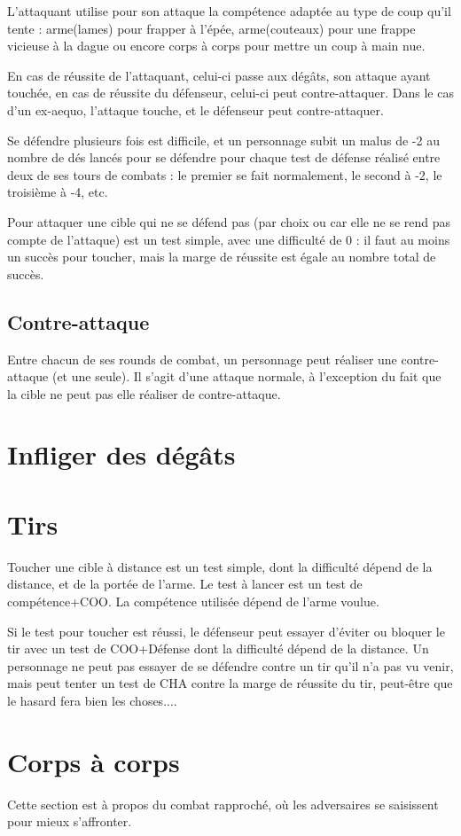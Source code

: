 \documentclass[10pt,a4paper,twocolumn]{book}
\begin{document}
L'attaquant utilise pour son attaque la compétence adaptée au type de coup qu'il tente : arme(lames) pour frapper à l'épée, arme(couteaux) pour une frappe vicieuse à la dague ou encore corps à corps pour mettre un coup à main nue.

En cas de réussite de l'attaquant, celui-ci passe aux dégâts, son attaque ayant touchée, en cas de réussite du défenseur, celui-ci peut contre-attaquer. Dans le cas d'un ex-aequo, l'attaque touche, et le défenseur peut contre-attaquer.

Se défendre plusieurs fois est difficile, et un personnage subit un malus de -2 au nombre de dés lancés pour se défendre pour chaque test de défense réalisé entre deux de ses tours de combats : le premier se fait normalement, le second à -2, le troisième à -4, etc.

Pour attaquer une cible qui ne se défend pas (par choix ou car elle ne se rend pas compte de l'attaque) est un test simple, avec une difficulté de 0 : il faut au moins un succès pour toucher, mais la marge de réussite est égale au nombre total de succès.
\subsection{Contre-attaque}
Entre chacun de ses rounds de combat, un personnage peut réaliser une contre-attaque (et une seule). Il s'agit d'une attaque normale, à l'exception du fait que la cible ne peut pas elle réaliser de contre-attaque.
\section{Infliger des dégâts}

\section{Tirs}
Toucher une cible à distance est un test simple, dont la difficulté dépend de la distance, et de la portée de l'arme. Le test à lancer est un test de compétence+COO. La compétence utilisée dépend de l'arme voulue.

Si le test pour toucher est réussi, le défenseur peut essayer d'éviter ou bloquer le tir avec un test de COO+Défense dont la difficulté dépend de la distance. Un personnage ne peut pas essayer de se défendre contre un tir qu'il n'a pas vu venir, mais peut tenter un test de CHA contre la marge de réussite du tir, peut-être que le hasard fera bien les choses....


\section{Corps à corps}
Cette section est à propos du combat rapproché, où les adversaires se saisissent pour mieux s'affronter.
\end{document}
